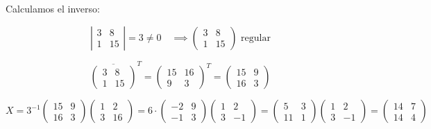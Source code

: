 \documentclass[a4paper,12pt]{article}
\begin{document}
\begin{ejercicio}[title=Ejercicio 20]
\vspace{0.5em}

Calculamos el inverso:

\[
\left|
\begin{matrix}
3 & 8\\
1 & 15
\end{matrix}
\right| = 3 \ne 0 \quad \implies
\begin{pmatrix}
    3 & 8\\
1 & 15
\end{pmatrix}
\text{ regular}
\]

\[
{\overline{
\begin{pmatrix}
3 & 8\\
1 & 15
\end{pmatrix}
}}^T
=
\begin{pmatrix}
15 & 16\\
9 & 3
\end{pmatrix}^T
=
\begin{pmatrix}
15 & 9\\
16 & 3
\end{pmatrix}
\]

\[
X = 3^{-1} 
\begin{pmatrix}
15 & 9\\
16 & 3
\end{pmatrix}
\begin{pmatrix}
1 & 2\\
3 & 16
\end{pmatrix}
= 6 \cdot
\begin{pmatrix}
-2 & 9\\
-1 & 3
\end{pmatrix}
\begin{pmatrix}
1 & 2\\
3 & -1
\end{pmatrix}
=
\begin{pmatrix}
5 & 3\\
11 & 1
\end{pmatrix}
\begin{pmatrix}
1 & 2\\
3 & -1
\end{pmatrix}
=
\boxed{
\begin{pmatrix}
14 & 7\\
14 & 4
\end{pmatrix}}
\]
\end{ejercicio}
\end{document}
